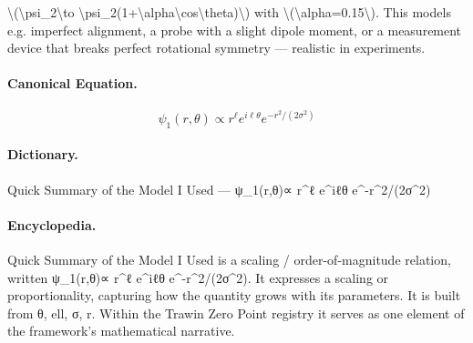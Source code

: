 \textbackslash{}(\textbackslash{}psi\_2\textbackslash{}to \textbackslash{}psi\_2(1+\textbackslash{}alpha\textbackslash{}cos\textbackslash{}theta)\textbackslash{}) with \textbackslash{}(\textbackslash{}alpha=0.15\textbackslash{}). This models e.g. imperfect alignment, a probe with a slight dipole moment, or a measurement device that breaks perfect rotational symmetry — realistic in experiments.

\paragraph{Canonical Equation.}
\[
\psi_1(r,\theta)\propto r^{\ell} e^{i\ell\theta} e^{-r^2/(2\sigma^2)}
\]

\paragraph{Dictionary.}
Quick Summary of the Model I Used — ψ\_1(r,θ)∝ r\textasciicircum{}ℓ e\textasciicircum{}iℓθ e\textasciicircum{}-r\textasciicircum{}2/(2σ\textasciicircum{}2)

\paragraph{Encyclopedia.}
Quick Summary of the Model I Used is a scaling / order-of-magnitude relation, written ψ\_1(r,θ)∝ r\textasciicircum{}ℓ e\textasciicircum{}iℓθ e\textasciicircum{}-r\textasciicircum{}2/(2σ\textasciicircum{}2). It expresses a scaling or proportionality, capturing how the quantity grows with its parameters. It is built from θ, ell, σ, r. Within the Trawin Zero Point registry it serves as one element of the framework's mathematical narrative.
